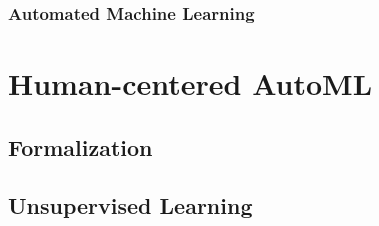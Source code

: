 \documentclass[a4paper,12pt,times,numbered,print,index]{Classes/PhDThesisPSnPDF}
\begin{document}





\section{Automated Machine Learning}\label{automl-background-sec:automl}





\part{Human-centered AutoML}\label{part:automl}


\chapter{Formalization}\label{automl-chap:formalization}

% 

% 
% 
% 


\chapter{Unsupervised Learning}
\label{automl-chap:unsupervised}
\end{document}
